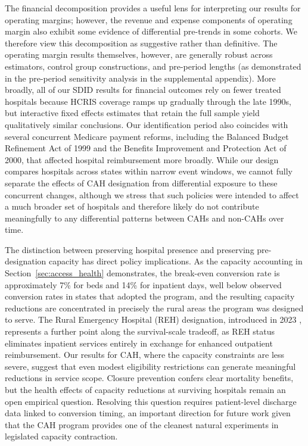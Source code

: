\documentclass[a4paper, 12pt, twoside]{article}
\begin{document}
The financial decomposition provides a useful lens for interpreting our results for operating margins; however, the revenue and expense components of operating margin also exhibit some evidence of differential pre-trends in some cohorts. We therefore view this decomposition as suggestive rather than definitive. The operating margin results themselves, however, are generally robust across estimators, control group constructions, and pre-period lengths (as demonstrated in the pre-period sensitivity analysis in the supplemental appendix). More broadly, all of our SDID results for financial outcomes rely on fewer treated hospitals because HCRIS coverage ramps up gradually through the late 1990s, but interactive fixed effects estimates that retain the full sample yield qualitatively similar conclusions. Our identification period also coincides with several concurrent Medicare payment reforms, including the Balanced Budget Refinement Act of 1999 and the Benefits Improvement and Protection Act of 2000, that affected hospital reimbursement more broadly. While our design compares hospitals across states within narrow event windows, we cannot fully separate the effects of CAH designation from differential exposure to these concurrent changes, although we stress that such policies were intended to affect a much broader set of hospitals and therefore likely do not contribute meaningfully to any differential patterns between CAHs and non-CAHs over time.

The distinction between preserving hospital presence and preserving pre-designation capacity has direct policy implications. As the capacity accounting in Section~\ref{sec:access_health} demonstrates, the break-even conversion rate is approximately 7\% for beds and 14\% for inpatient days, well below observed conversion rates in states that adopted the program, and the resulting capacity reductions are concentrated in precisely the rural areas the program was designed to serve. The Rural Emergency Hospital (REH) designation, introduced in 2023 \citep{cms2022}, represents a further point along the survival-scale tradeoff, as REH status eliminates inpatient services entirely in exchange for enhanced outpatient reimbursement. Our results for CAH, where the capacity constraints are less severe, suggest that even modest eligibility restrictions can generate meaningful reductions in service scope. Closure prevention confers clear mortality benefits, but the health effects of capacity reductions at surviving hospitals remain an open empirical question. Resolving this question requires patient-level discharge data linked to conversion timing, an important direction for future work given that the CAH program provides one of the cleanest natural experiments in legislated capacity contraction.
\end{document}
